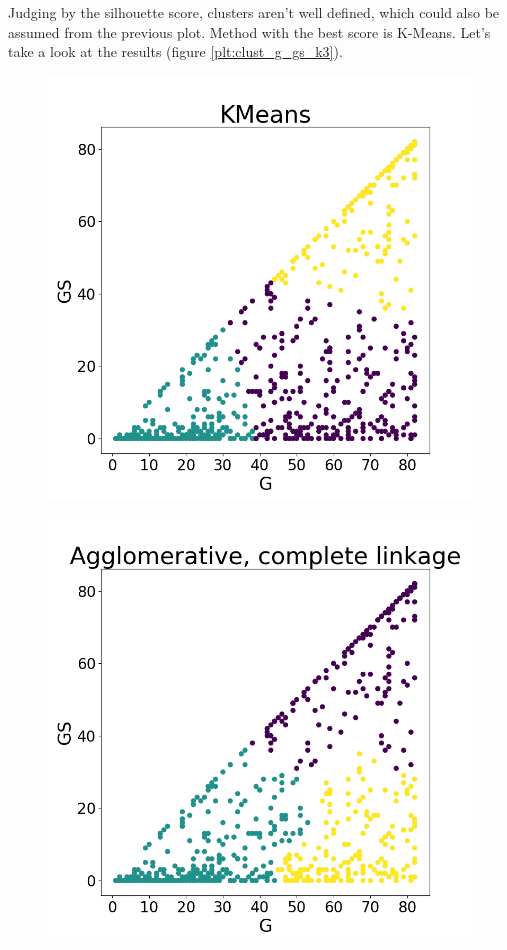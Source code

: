 \documentclass[a4paper]{article}
\begin{document}
Judging by the silhouette score, clusters aren't well defined, which could also be assumed from the previous plot. Method with the best score is K-Means.
Let's take a look at the results (figure \ref{plt:clust_g_gs_k3}).

\begin{figure}
\centering
\begin{minipage}{.22\textwidth}
  \centering
  \includegraphics[scale=0.14]{kmeans_g_gs.png}
  \label{fig:kmeans_g_gs}
\end{minipage}
\begin{minipage}{.22\textwidth}
  \centering
  \includegraphics[scale=0.14]{complete_link_g_gs.png}

\end{minipage}
\end{figure}
\end{document}
